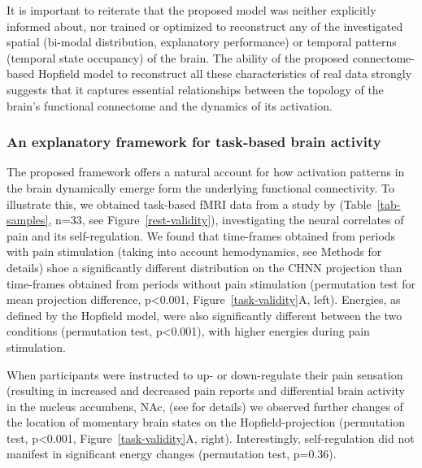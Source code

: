 \documentclass{article}
\begin{document}
It is important to reiterate that the proposed model was neither explicitly informed about, nor trained or optimized to reconstruct any of the investigated spatial (bi-modal distribution, explanatory performance) or temporal patterns (temporal state occupancy) of the brain.
The ability of the proposed connectome-based Hopfield model to reconstruct all these characteristics of real data strongly suggests that it captures essential relationships between the topology of the brain's functional connectome and the dynamics of its activation.

\subsubsection{An explanatory framework for task-based brain activity}\label{An explanatory framework for task-based brain activity}

The proposed framework offers a natural account for how activation patterns in the brain dynamically emerge form the
underlying functional connectivity. To illustrate this, we obtained task-based fMRI data from a study by
\citet{woo2015distinct} (Table~\ref{tab-samples}, n=33, see Figure~\ref{rest-validity}), investigating the neural
correlates of pain and its self-regulation. We found that time-frames obtained from periods with pain stimulation
(taking into account hemodynamics, see Methods for details) shoe a significantly different distribution on the CHNN projection
than time-frames obtained from periods without pain stimulation (permutation test for mean projection difference, p\textless 0.001, Figure~\ref{task-validity}A, left). Energies, as defined by the Hopfield model, were also significantly different between the two conditions
(permutation test, p\textless 0.001), with higher energies during pain stimulation.

When participants were instructed to up- or down-regulate their pain sensation (resulting in increased and decreased
pain reports and differential brain activity in the nucleus accumbens, NAc, (see \citep{woo2015distinct} for details)
we observed further changes of the location of momentary brain states on the Hopfield-projection (permutation test,
p\textless 0.001, Figure~\ref{task-validity}A, right). Interestingly, self-regulation did not manifest in significant energy changes
(permutation test, p=0.36).
\end{document}
